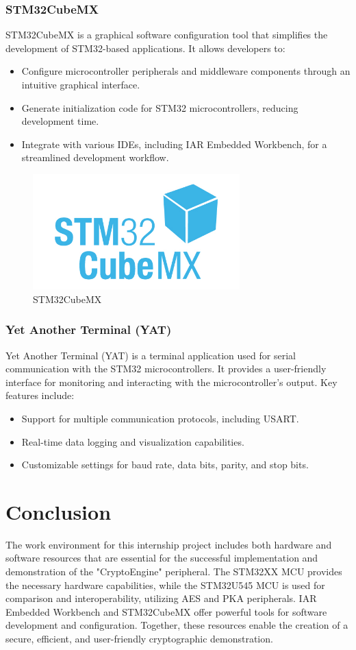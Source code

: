 \subsubsection{STM32CubeMX}
STM32CubeMX is a graphical software configuration tool that simplifies the development of STM32-based applications. It allows developers to:
\begin{itemize}
    \item Configure microcontroller peripherals and middleware components through an intuitive graphical interface.
    \item Generate initialization code for STM32 microcontrollers, reducing development time.
    \item Integrate with various IDEs, including IAR Embedded Workbench, for a streamlined development workflow.
\end{itemize}
\begin{figure}[H]
  \centering
  \includegraphics[width=8cm]{img/CUBEMX.jpg}
  \caption{STM32CubeMX}
  \label{fig:mx}
\end{figure}
\subsubsection{Yet Another Terminal (YAT)}
Yet Another Terminal (YAT) is a terminal application used for serial communication with the STM32 microcontrollers. It provides a user-friendly interface for monitoring and interacting with the microcontroller's output. Key features include:
\begin{itemize}
    \item Support for multiple communication protocols, including USART.
    \item Real-time data logging and visualization capabilities.
    \item Customizable settings for baud rate, data bits, parity, and stop bits.
\end{itemize}
\section*{Conclusion}
The work environment for this internship project includes both hardware and software resources that are essential for the successful implementation and demonstration of the "CryptoEngine" peripheral. The STM32XX MCU provides the necessary hardware capabilities, while the STM32U545 MCU is used for comparison and interoperability, utilizing AES and PKA peripherals. IAR Embedded Workbench and STM32CubeMX offer powerful tools for software development and configuration. Together, these resources enable the creation of a secure, efficient, and user-friendly cryptographic demonstration.
